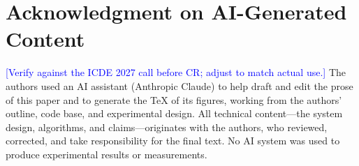 \documentclass[conference]{IEEEtran}
\newcommand{\NOTE}[1]{\textcolor{blue}{[#1]}}
\begin{document}








\section*{Acknowledgment on AI-Generated Content}
\NOTE{Verify against the ICDE 2027 call before CR; adjust to match actual use.}
The authors used an AI assistant (Anthropic Claude) to help draft and edit the
prose of this paper and to generate the \TeX{} of its figures, working from the
authors' outline, code base, and experimental design. All technical content---the
system design, algorithms, and claims---originates with the authors, who
reviewed, corrected, and take responsibility for the final text. No AI system was
used to produce experimental results or measurements.



\end{document}
